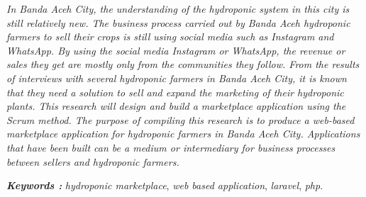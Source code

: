 \begin{abstracteng}
\textit{In Banda Aceh City, the understanding of the hydroponic system in this city is still relatively new. The business process carried out by Banda Aceh hydroponic farmers to sell their crops is still using social media such as Instagram and WhatsApp. By using the social media Instagram or WhatsApp, the revenue or sales they get are mostly only from the communities they follow. From the results of interviews with several hydroponic farmers in Banda Aceh City, it is known that they need a solution to sell and expand the marketing of their hydroponic plants. This research will design and build a marketplace application using the Scrum method. The purpose of compiling this research is to produce a web-based marketplace application for hydroponic farmers in Banda Aceh City. Applications that have been built can be a medium or intermediary for business processes between sellers and hydroponic farmers.}

\bigskip
\noindent
\textbf{\emph{Keywords :}} \textit{hydroponic marketplace}, \textit{web based application}, \textit{laravel}, \textit{php}.
\end{abstracteng}